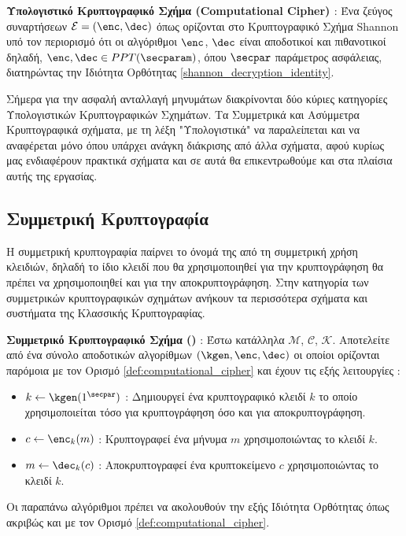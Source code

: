 \begin{definition}
\label{def:computational_cipher}
\textbf{Υπολογιστικό Κρυπτογραφικό Σχήμα (Computational Cipher) \cite{boneh2020graduate}} : Ένα ζεύγος συναρτήσεων $\mathcal{E} = (\enc, \dec)$ όπως ορίζονται στο Κρυπτογραφικό Σχήμα Shannon υπό τον περιορισμό ότι οι αλγόριθμοι $\enc$, $\dec$ είναι αποδοτικοί και πιθανοτικοί δηλαδή, $\enc, \dec \in PPT(\secparam)$, όπου $\secpar$ παράμετρος ασφάλειας, διατηρώντας την Ιδιότητα Ορθότητας \ref{shannon_decryption_identity}.
\end{definition}

Σήμερα για την ασφαλή ανταλλαγή μηνυμάτων διακρίνονται δύο κύριες κατηγορίες Υπολογιστικών Κρυπτογραφικών Σχημάτων. Τα Συμμετρικά και Ασύμμετρα Κρυπτογραφικά σχήματα, με τη λέξη "Υπολογιστικά" να παραλείπεται και να αναφέρεται μόνο όπου υπάρχει ανάγκη διάκρισης από άλλα σχήματα, αφού κυρίως μας ενδιαφέρουν πρακτικά σχήματα και σε αυτά θα επικεντρωθούμε και στα πλαίσια αυτής της εργασίας.

\subsection{Συμμετρική Κρυπτογραφία}

Η συμμετρική κρυπτογραφία παίρνει το όνομά της από τη συμμετρική χρήση κλειδιών, δηλαδή το ίδιο κλειδί που θα χρησιμοποιηθεί για την κρυπτογράφηση θα πρέπει να χρησιμοποιηθεί και για την αποκρυπτογράφηση. Στην κατηγορία των συμμετρικών κρυπτογραφικών σχημάτων ανήκουν τα περισσότερα σχήματα και συστήματα της Κλασσικής Κρυπτογραφίας.

\begin{definition}
\label{def:symetric_cryptographic_scheme}
\textbf{Συμμετρικό Κρυπτογραφικό Σχήμα ()} : Έστω κατάλληλα $\mathcal{M}$, $\mathcal{C}$, $\mathcal{K}$. Αποτελείτε από ένα σύνολο αποδοτικών αλγορίθμων $(\kgen, \enc, \dec)$ οι οποίοι ορίζονται παρόμοια με τον Ορισμό \ref{def:computational_cipher} και έχουν τις εξής λειτουργίες :
\begin{itemize}
    \item $k \leftarrow \kgen(1^\secpar)$ : Δημιουργεί ένα κρυπτογραφικό κλειδί $k$ το οποίο χρησιμοποιείται τόσο για κρυπτογράφηση όσο και για αποκρυπτογράφηση.
    \item $c \leftarrow \enc_{k}(m)$ : Κρυπτογραφεί ένα μήνυμα $m$ χρησιμοποιώντας το κλειδί $k$.
    \item $m \leftarrow \dec_{k}(c)$ : Αποκρυπτογραφεί ένα κρυπτοκείμενο $c$ χρησιμοποιώντας το κλειδί $k$.
\end{itemize}
Οι παραπάνω αλγόριθμοι πρέπει να ακολουθούν την εξής Ιδιότητα Ορθότητας όπως ακριβώς και με τον Ορισμό \ref{def:computational_cipher}.
\end{definition}

